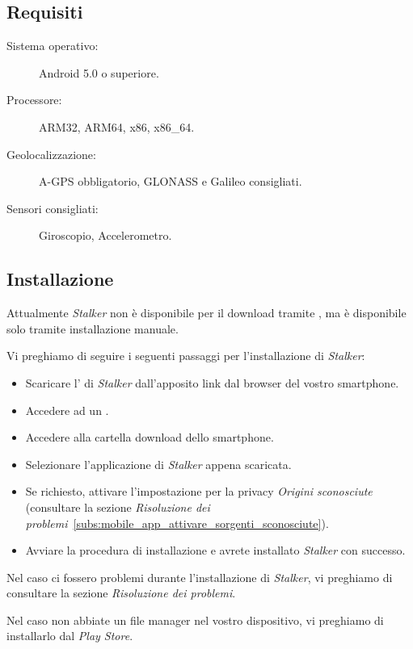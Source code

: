 \documentclass[../manuale-utente.tex]{subfiles}
\begin{document}
\subsection{Requisiti}%
\label{sub:mobile_app_requisiti}

\begin{description}
    \item[Sistema operativo:] Android 5.0 o superiore.
    \item[Processore:] ARM32, ARM64, x86, x86\_64.
    \item[Geolocalizzazione:] A-GPS obbligatorio, GLONASS e Galileo consigliati.
    \item[Sensori consigliati:] Giroscopio, Accelerometro.
\end{description}

\subsection{Installazione}

Attualmente \textit{Stalker} non è disponibile per il download tramite \textit{}, ma è disponibile solo tramite installazione manuale.

Vi preghiamo di seguire i seguenti passaggi per l'installazione di \textit{Stalker}:
\begin{itemize}
    \item Scaricare l'\textit{} di \textit{Stalker} dall'apposito link dal browser del vostro smartphone.
    \item Accedere ad un .
    \item Accedere alla cartella download dello smartphone.
    \item Selezionare l'applicazione di \textit{Stalker} appena scaricata.
    \item Se richiesto, attivare l'impostazione per la privacy \textit{Origini sconosciute} (consultare la sezione \textit{Risoluzione dei problemi}~\ref{subs:mobile_app_attivare_sorgenti_sconosciute}).
    \item Avviare la procedura di installazione e avrete installato \textit{Stalker} con successo.
\end{itemize}

Nel caso ci fossero problemi durante l'installazione di \textit{Stalker}, vi preghiamo di consultare la sezione \textit{Risoluzione dei problemi}.

Nel caso non abbiate un file manager nel vostro dispositivo, vi preghiamo di installarlo dal \textit{Play Store}.
\newpage
\end{document}
